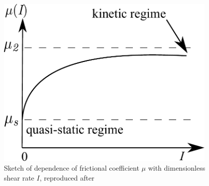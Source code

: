 \begin{figure}[tbhp]
\centering
\includegraphics[width=0.95\textwidth]{mu}
\caption[Dependence of frictional coefficient $\mu$ with dimensionless shear 
rate $\textit{I}$]{Sketch of dependence of frictional coefficient $\mu$ with 
dimensionless shear rate $\textit{I}$, reproduced after ~\citet{Pouliquen2006}}
\label{fig:mu}
\end{figure}

